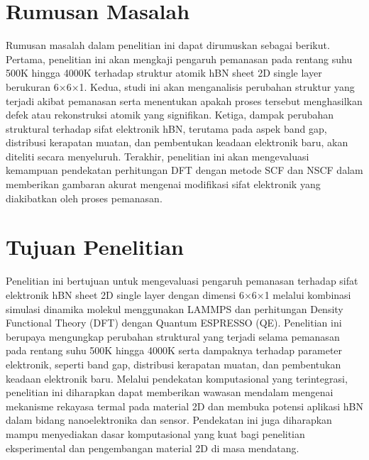 \section{Rumusan Masalah}
Rumusan masalah dalam penelitian ini dapat dirumuskan sebagai berikut. Pertama, penelitian ini akan mengkaji pengaruh pemanasan pada rentang suhu 500K hingga 4000K terhadap struktur atomik hBN sheet 2D single layer berukuran 6×6×1. Kedua, studi ini akan menganalisis perubahan struktur yang terjadi akibat pemanasan serta menentukan apakah proses tersebut menghasilkan defek atau rekonstruksi atomik yang signifikan. Ketiga, dampak perubahan struktural terhadap sifat elektronik hBN, terutama pada aspek band gap, distribusi kerapatan muatan, dan pembentukan keadaan elektronik baru, akan diteliti secara menyeluruh. Terakhir, penelitian ini akan mengevaluasi kemampuan pendekatan perhitungan DFT dengan metode SCF dan NSCF dalam memberikan gambaran akurat mengenai modifikasi sifat elektronik yang diakibatkan oleh proses pemanasan.

\section{Tujuan Penelitian}
Penelitian ini bertujuan untuk mengevaluasi pengaruh pemanasan terhadap sifat elektronik hBN sheet 2D single layer dengan dimensi 6×6×1 melalui kombinasi simulasi dinamika molekul menggunakan LAMMPS dan perhitungan Density Functional Theory (DFT) dengan Quantum ESPRESSO (QE). Penelitian ini berupaya mengungkap perubahan struktural yang terjadi selama pemanasan pada rentang suhu 500K hingga 4000K serta dampaknya terhadap parameter elektronik, seperti band gap, distribusi kerapatan muatan, dan pembentukan keadaan elektronik baru. Melalui pendekatan komputasional yang terintegrasi, penelitian ini diharapkan dapat memberikan wawasan mendalam mengenai mekanisme rekayasa termal pada material 2D dan membuka potensi aplikasi hBN dalam bidang nanoelektronika dan sensor. Pendekatan ini juga diharapkan mampu menyediakan dasar komputasional yang kuat bagi penelitian eksperimental dan pengembangan material 2D di masa mendatang.


